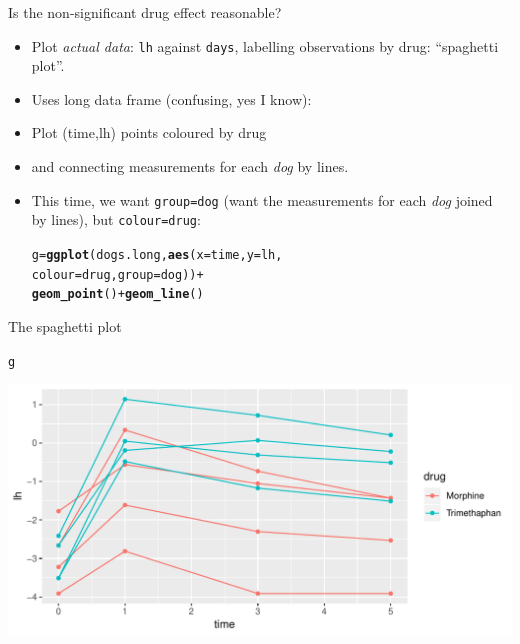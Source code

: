 \documentclass[unknownkeysallowed]{beamer}\usepackage[]{graphicx}\usepackage[]{color}
\makeatletter
\def\maxwidth{ %
  \ifdim\Gin@nat@width>\linewidth
    \linewidth
  \else
    \Gin@nat@width
  \fi
}
\newcommand{\hlopt}[1]{\textcolor[rgb]{0,0,0}{#1}}%
\newcommand{\hlstd}[1]{\textcolor[rgb]{0.345,0.345,0.345}{#1}}%
\newcommand{\hlkwb}[1]{\textcolor[rgb]{0.69,0.353,0.396}{#1}}%
\newcommand{\hlkwc}[1]{\textcolor[rgb]{0.333,0.667,0.333}{#1}}%
\newcommand{\hlkwd}[1]{\textcolor[rgb]{0.737,0.353,0.396}{\textbf{#1}}}%
\newenvironment{kframe}{%
 \def\at@end@of@kframe{}%
 \ifinner\ifhmode%
  \def\at@end@of@kframe{\end{minipage}}%
  \begin{minipage}{\columnwidth}%
 \fi\fi%
 \def\FrameCommand##1{\hskip\@totalleftmargin \hskip-\fboxsep
 \colorbox{shadecolor}{##1}\hskip-\fboxsep
     \hskip-\linewidth \hskip-\@totalleftmargin \hskip\columnwidth}%
 \MakeFramed {\advance\hsize-\width
   \@totalleftmargin\z@ \linewidth\hsize
   \@setminipage}}%
 {\par\unskip\endMakeFramed%
 \at@end@of@kframe}
\newenvironment{knitrout}{}{} %
\makeatother
\begin{document}
\begin{frame}[fragile]{Is the non-significant drug effect reasonable?}
  
  \begin{itemize}
  \item Plot \emph{actual data}: \texttt{lh} against \texttt{days},
    labelling observations by drug: ``spaghetti plot''.
  \item Uses long data frame (confusing, yes I know):
 

\item Plot (time,lh) points coloured  by drug
\item and connecting measurements for each \emph{dog} by lines.

  
\item This time, we want \texttt{group=dog} (want the measurements for each
\emph{dog} joined by lines), but \texttt{colour=drug}:
  
\begin{knitrout}
\color{fgcolor}\begin{kframe}
\begin{alltt}
\hlstd{g}\hlkwb{=}\hlkwd{ggplot}\hlstd{(dogs.long,}\hlkwd{aes}\hlstd{(}\hlkwc{x}\hlstd{=time,}\hlkwc{y}\hlstd{=lh,}
    \hlkwc{colour}\hlstd{=drug,}\hlkwc{group}\hlstd{=dog))} \hlopt{+}
  \hlkwd{geom_point}\hlstd{()}\hlopt{+}\hlkwd{geom_line}\hlstd{()}
\end{alltt}
\end{kframe}
\end{knitrout}
\end{itemize}
  
\end{frame}

\begin{frame}[fragile]{The spaghetti plot}
  
\begin{knitrout}
\color{fgcolor}\begin{kframe}
\begin{alltt}
\hlstd{g}
\end{alltt}
\end{kframe}
\includegraphics[width=\maxwidth]{figure/hoverla-1} 

\end{knitrout}
  
\end{frame}
\end{document}

